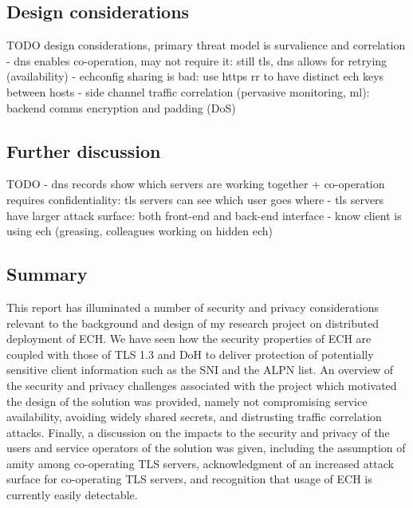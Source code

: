 \documentclass[a4paper,oneside,12pt]{article}
\begin{document}
\subsection*{Design considerations}

TODO
design considerations, primary threat model is survalience and correlation
- dns enables co-operation, may not require it: still tls, dns allows for retrying (availability)
- echconfig sharing is bad: use https rr to have distinct ech keys between hosts
- side channel traffic correlation (pervasive monitoring, ml): backend comms encryption and padding (DoS)


\subsection*{Further discussion}

TODO
- dns records show which servers are working together + co-operation requires confidentiality: tls servers can see which user goes where
- tls servers have larger attack surface: both front-end and back-end interface
- know client is using ech (greasing, colleagues working on hidden ech)


\subsection*{Summary}

This report has illuminated a number of security and privacy considerations relevant to the background and design of my research project on distributed deployment of ECH. We have seen how the security properties of ECH are coupled with those of TLS 1.3 and DoH to deliver protection of potentially sensitive client information such as the SNI and the ALPN list. An overview of the security and privacy challenges associated with the project which motivated the design of the solution was provided, namely not compromising service availability, avoiding widely shared secrets, and distrusting traffic correlation attacks. Finally, a discussion on the impacts to the security and privacy of the users and service operators of the solution was given, including the assumption of amity among co-operating TLS servers, acknowledgment of an increased attack surface for co-operating TLS servers, and recognition that usage of ECH is currently easily detectable.

\printbibliography
\end{document}
